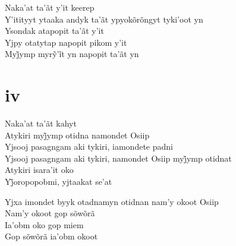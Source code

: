 \begin{linenumbers}
 
\noindent   Naka'at ta'ãt y'it keerep\\
  Y'itityyt ytaaka andyk ta'ãt ypyokõrõngyt tyki'oot yn\\
  Ysondak atapopit ta'ãt y'it\\
  Yjpy otatytap napopit pikom y'it\\
  Myj̃ymp myrỹ’ĩt yn napopit ta’ãt yn
 
 
\medskip
\section{iv}

  \noindent Naka'at ta'ãt kahyt\\
  Atykiri myj̃ymp otidna namondet Osiip\\
  Yjsooj pasagngam aki tykiri, iamondete padni\\
  Yjsooj pasagngam aki tykiri, namondet Osiip myj̃ymp otidnat\\
  Atykiri isara'it oko\\
  Yj̃oropopobmi, yjtaakat se’at
 
\end{linenumbers}

\bigskip

\begin{linenumbers}
 
\noindent   Yjxa imondet byyk otadnamyn otidnan nam'y okoot Osiip\\
  Nam'y okoot gop sõwõrã\\
  Ia'obm oko gop miem\\
  Gop sõwõrã ia'obm okoot
 
\end{linenumbers}

